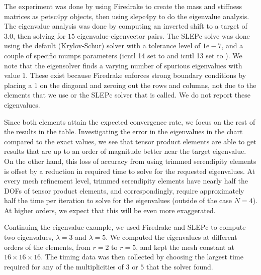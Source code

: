 \documentclass[format=acmsmall,screen,timestamp=false,a4paper]{acmart}
\begin{document}
The experiment was done by using Firedrake to create the mass and stiffness matrices as petsc4py objects, then using slepc4py to do the eigenvalue analysis.  The eigenvalue analysis was done by computing an inverted shift to a target of $3.0$, then solving for $15$ eigenvalue-eigenvector pairs.  The SLEPc solve was done using the default (Krylov-Schur) solver with a tolerance level of $1\text{e}-7$, and a couple of specific mumps parameters ({\selectfont icntl 14} set to {} and {\selectfont icntl 13} set to {}).
We note that the eigensolver finds a varying number of spurious eigenvalues with value $1$.  These exist because Firedrake enforces strong boundary conditions by placing a 1 on the diagonal and zeroing out the rows and columns, not due to the elements that we use or the SLEPc solver that is called.  We do not report these eigenvalues.

Since both elements attain the expected convergence rate, we focus on the rest of the results in the table.  Investigating the error in the eigenvalues in the chart compared to the exact values, we see that tensor product elements are able to get results that are up to an order of magnitude better near the target eigenvalue.  On the other hand, this loss of accuracy from using trimmed serendipity elements is offset by a reduction in required time to solve for the requested eigenvalues.  At every mesh refinement level, trimmed serendipity elements have nearly half the DOFs of tensor product elements, and correspondingly, require approximately half the time per iteration to solve for the eigenvalues (outside of the case $N=4$).  At higher orders, we expect that this will be even more exaggerated.  

Continuing the eigenvalue example, we used Firedrake and SLEPc to compute two eigenvalues, $\lambda = 3$ and $\lambda = 5$. We computed the eigenvalues at different orders of the elements, from $r=2$ to $r=5$, and kept the mesh constant at $16 \times 16 \times 16$.  The timing data was then collected by choosing the largest time required for any of the multiplicities of $3$ or $5$ that the solver found. 
\end{document}
